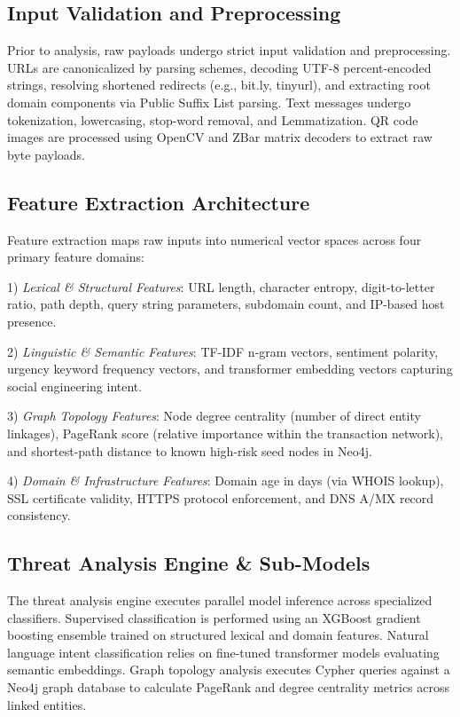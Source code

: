 \documentclass[conference,a4paper]{IEEEtran}
\begin{document}
\subsection{Input Validation and Preprocessing}
Prior to analysis, raw payloads undergo strict input validation and preprocessing. URLs are canonicalized by parsing schemes, decoding UTF-8 percent-encoded strings, resolving shortened redirects (e.g., bit.ly, tinyurl), and extracting root domain components via Public Suffix List parsing. Text messages undergo tokenization, lowercasing, stop-word removal, and Lemmatization. QR code images are processed using OpenCV and ZBar matrix decoders to extract raw byte payloads.

\subsection{Feature Extraction Architecture}
Feature extraction maps raw inputs into numerical vector spaces across four primary feature domains:

1) \textit{Lexical \& Structural Features}: URL length, character entropy, digit-to-letter ratio, path depth, query string parameters, subdomain count, and IP-based host presence.

2) \textit{Linguistic \& Semantic Features}: TF-IDF n-gram vectors, sentiment polarity, urgency keyword frequency vectors, and transformer embedding vectors capturing social engineering intent.

3) \textit{Graph Topology Features}: Node degree centrality (number of direct entity linkages), PageRank score (relative importance within the transaction network), and shortest-path distance to known high-risk seed nodes in Neo4j.

4) \textit{Domain \& Infrastructure Features}: Domain age in days (via WHOIS lookup), SSL certificate validity, HTTPS protocol enforcement, and DNS A/MX record consistency.

\subsection{Threat Analysis Engine \& Sub-Models}
The threat analysis engine executes parallel model inference across specialized classifiers. Supervised classification is performed using an XGBoost gradient boosting ensemble trained on structured lexical and domain features. Natural language intent classification relies on fine-tuned transformer models evaluating semantic embeddings. Graph topology analysis executes Cypher queries against a Neo4j graph database to calculate PageRank and degree centrality metrics across linked entities.
\end{document}
